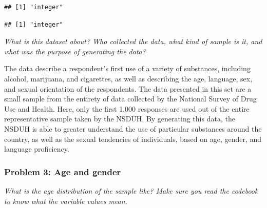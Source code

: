 \documentclass[
]{article}
\newenvironment{Shaded}{\begin{snugshade}}{\end{snugshade}}
\newcommand{\AttributeTok}[1]{\textcolor[rgb]{0.77,0.63,0.00}{#1}}
\newcommand{\FunctionTok}[1]{\textcolor[rgb]{0.00,0.00,0.00}{#1}}
\newcommand{\NormalTok}[1]{#1}
\newcommand{\SpecialCharTok}[1]{\textcolor[rgb]{0.00,0.00,0.00}{#1}}
\newcommand{\StringTok}[1]{\textcolor[rgb]{0.31,0.60,0.02}{#1}}
\begin{document}
\begin{verbatim}
## [1] "integer"
\end{verbatim}

\begin{Shaded}
\end{Shaded}

\begin{verbatim}
## [1] "integer"
\end{verbatim}

\emph{What is this dataset about? Who collected the data, what kind of
sample is it, and what was the purpose of generating the data?}

The data describe a respondent's first use of a variety of substances,
including alcohol, marijuana, and cigarettes, as well as describing the
age, language, sex, and sexual orientation of the respondents. The data
presented in this set are a small sample from the entirety of data
collected by the National Survey of Drug Use and Health. Here, only the
first 1,000 responses are used out of the entire representative sample
taken by the NSDUH. By generating this data, the NSDUH is able to
greater understand the use of particular substances around the country,
as well as the sexual tendencies of individuals, based on age, gender,
and language proficiency.

\hypertarget{problem-3-age-and-gender}{%
\subsubsection{Problem 3: Age and
gender}\label{problem-3-age-and-gender}}

\emph{What is the age distribution of the sample like? Make sure you
read the codebook to know what the variable values mean.}

\begin{Shaded}
\end{Shaded}
\end{document}
